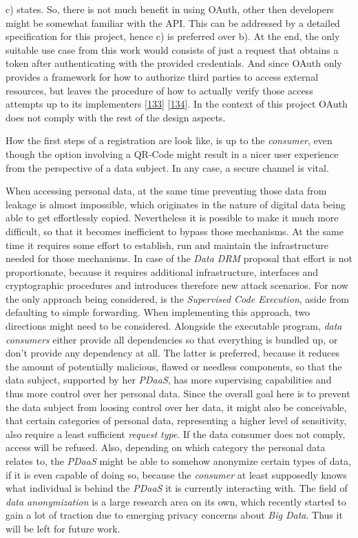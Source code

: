 \documentclass[12pt,english,a4paper,titlepage,cleardoublepage=empty,dottedtoc]{report}
\begin{document}
c) states. So, there is not much benefit in using OAuth, other then
developers might be somewhat familiar with the API. This can be
addressed by a detailed specification for this project, hence c) is
preferred over b). At the end, the only suitable use case from this work
would consists of just a request that obtains a token after
authenticating with the provided credentials. And since OAuth only
provides a framework for how to authorize third parties to access
external resources, but leaves the procedure of how to actually verify
those access attempts up to its implementers
{[}\protect\hyperlink{ref-web_spec_oauth-1a_access-verification}{133}{]}
{[}\protect\hyperlink{ref-web_spec_oauth-2_access-verification}{134}{]}.
In the context of this project OAuth does not comply with the rest of
the design aspects.

How the first steps of a registration are look like, is up to the
\emph{consumer}, even though the option involving a QR-Code might result
in a nicer user experience from the perspective of a data subject. In
any case, a secure channel is vital.

When accessing personal data, at the same time preventing those data
from leakage is almost impossible, which originates in the nature of
digital data being able to get effortlessly copied. Nevertheless it is
possible to make it much more difficult, so that it becomes inefficient
to bypass those mechanisms. At the same time it requires some effort to
establish, run and maintain the infrastructure needed for those
mechanisms. In case of the \emph{Data DRM} proposal that effort is not
proportionate, because it requires additional infrastructure, interfaces
and cryptographic procedures and introduces therefore new attack
scenarios. For now the only approach being considered, is the
\emph{Supervised Code Execution}, aside from defaulting to simple
forwarding. When implementing this approach, two directions might need
to be considered. Alongside the executable program, \emph{data
consumers} either provide all dependencies so that everything is bundled
up, or don't provide any dependency at all. The latter is preferred,
because it reduces the amount of potentially malicious, flawed or
needless components, so that the data subject, supported by her
\emph{PDaaS}, has more supervising capabilities and thus more control
over her personal data. Since the overall goal here is to prevent the
data subject from loosing control over her data, it might also be
conceivable, that certain categories of personal data, representing a
higher level of sensitivity, also require a least sufficient
\emph{request type}. If the data consumer does not comply, access will
be refused. Also, depending on which category the personal data relates
to, the \emph{PDaaS} might be able to somehow anonymize certain types of
data, if it is even capable of doing so, because the \emph{consumer} at
least supposedly knows what individual is behind the \emph{PDaaS} it is
currently interacting with. The field of \emph{data anonymization} is a
large research area on its own, which recently started to gain a lot of
traction due to emerging privacy concerns about \emph{Big Data}. Thus it
will be left for future work.
\end{document}

